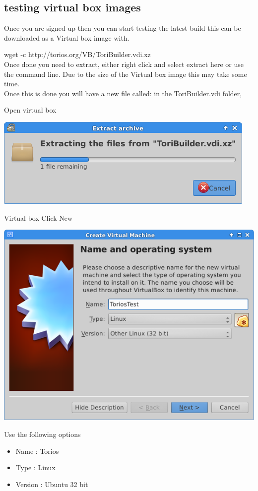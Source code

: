 \documentclass[12pt,a4paper]{book}
\begin{document}
\newpage

\subsection {testing virtual box images}
Once you are signed up then you can start testing the latest build this can be downloaded as a Virtual box image with.

wget -c http://torios.org/VB/ToriBuilder.vdi.xz \\

Once done you need to extract,   either right click and select extract here or use the command line.  Due to the size of the Virtual box image this may take some time. \\

Once this is done you will have a new file called:    in the ToriBuilder.vdi folder,  


Open virtual box

\begin{center}
\includegraphics[width=0.7\linewidth]{extractVBimage}
\end{center}

Virtual box 
Click New

\begin{center}
\item \includegraphics[width=0.7\linewidth]{ToriosTest01}
\end{center}

Use the following options
\begin{itemize}
\item Name : Torios
\item Type : Linux
\item Version : Ubuntu 32 bit
\end{itemize}
\end{document}
